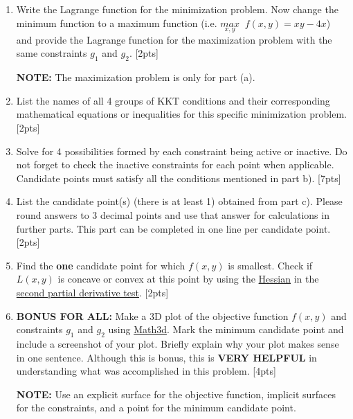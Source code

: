\documentclass{article}
\begin{document}
\begin{enumerate}[label=(\alph*)]
    \item Write the Lagrange function for the minimization problem. Now change the minimum function to a maximum function (i.e. $\underset{x,y}{max} \;\; f(x,y) = xy - 4x$) and provide the Lagrange function for the maximization problem with the same constraints $g_1$ and $g_2$.  [2pts]
        \par\textbf{NOTE:} The maximization problem is only for part (a).
    \item List the names of all 4 groups of KKT conditions and their corresponding mathematical equations or inequalities for this specific minimization problem. [2pts]
    \item Solve for 4 possibilities formed by each constraint being active or inactive. Do not forget to check the inactive constraints for each point when applicable. Candidate points must satisfy all the conditions mentioned in part b).   [7pts]
    \item List the candidate point(s) (there is at least 1) obtained from part c). Please round answers to 3 decimal points and use that answer for calculations in further parts. This part can be completed in one line per candidate point. [2pts]
    \item Find the \textbf{one} candidate point for which $f(x,y)$ is smallest. Check if $L(x,y)$ is concave or convex at this point by using the \href{https://www.khanacademy.org/math/multivariable-calculus/applications-of-multivariable-derivatives/quadratic-approximations/a/the-hessian}{Hessian} in the \href{https://www.khanacademy.org/math/multivariable-calculus/applications-of-multivariable-derivatives/optimizing-multivariable-functions/a/second-partial-derivative-test}{second partial derivative test}.  [2pts]
    \item \textbf{BONUS FOR ALL:} Make a 3D plot of the objective function $f(x,y)$ and constraints $g_1$ and $g_2$ using \href{https://www.math3d.org/}{Math3d}. Mark the minimum candidate point and include a screenshot of your plot. Briefly explain why your plot makes sense in one sentence. Although this is bonus, this is \textbf{VERY HELPFUL} in understanding what was accomplished in this problem. [4pts]
    \par\textbf{NOTE:} Use an explicit surface for the objective function, implicit surfaces for the constraints, and a point for the minimum candidate point. \\
\end{enumerate}
\end{document}

